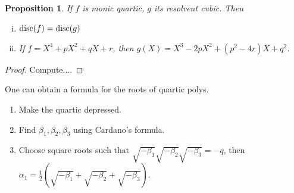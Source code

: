 \documentclass{article}
\theoremstyle{definition}
\theoremstyle{remark}
\theoremstyle{plain}
\newtheorem{prop}[defn]{Proposition}
\begin{document}
\begin{prop}
    If $f$ is monic quartic, $g$ its resolvent cubic. Then \begin{enumerate}[(i)]
        \item $\operatorname{disc}(f)=\operatorname{disc}(g)$
        \item If $f=X^4+pX^2+qX+r$, then $g(X)=X^3-2pX^2+(p^2-4r)X+q^2$.
    \end{enumerate}
\end{prop}
\begin{proof}
    Compute....
\end{proof}
One can obtain a formula for the roots of quartic polys.
\begin{enumerate}
    \item Make the quartic depressed.
    \item Find $\beta_1,\beta_2,\beta_3$ using Cardano's formula.
    \item Choose square roots such that $\sqrt{-\beta_1}\sqrt{-\beta_2}\sqrt{-\beta_3}=-q$, then $\alpha_1=\frac12(\sqrt{-\beta_1}+\sqrt{-\beta_2}+\sqrt{-\beta_3})$.
\end{enumerate}
\end{document}
